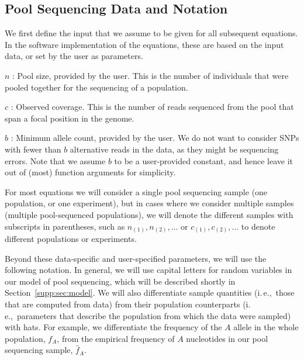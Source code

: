 \documentclass[a4paper,fontsize=9pt,DIV=14]{scrartcl}
\newcounter{todo}
\newcommand\todo[1]{}
\newcommand\secref[1]{Section~\ref{#1}}
\newcommand{\samplesize}{n}
\newcommand{\coverage}{c}
\newcommand{\empfreq}{\widehat{f}}
\newcommand{\ie}{i.\,e.,~}
\begin{document}
\subsection{Pool Sequencing Data and Notation}
\label{supp:sec:Definitions:sub:PoolSequencing}

We first define the input that we assume to be given for all subsequent equations.
In the software implementation of the equations, these are based on the input data, or set by the user as parameters.

$\samplesize$ :
Pool size, provided by the user. This is the number of individuals that were pooled together for the sequencing of a population.

$\coverage$ :
Observed coverage. This is the number of reads sequenced from the pool that span a focal position in the genome. 

$b$ :
Minimum allele count, provided by the user.
We do not want to consider SNPs with fewer than $b$ alternative reads in the data, as they might be sequencing errors.
Note that we assume $b$ to be a user-provided constant,
and hence leave it out of (most) function arguments for simplicity.

For most equations we will consider a single pool sequencing sample (one population, or one experiment), but in cases where we consider multiple samples (multiple pool-sequenced populations), we will denote the different samples with subscripts in parentheses, such as $\samplesize_{(1)}, \samplesize_{(2)},\ldots$ or $\coverage_{(1)}, \coverage_{(2)}, \ldots$ to denote different populations or experiments.

Beyond these data-specific and user-specified parameters, we will use the following notation.  In general, we will use capital letters for random variables in our model of pool sequencing, which will be described shortly in \secref{supp:sec:model}.  We will also differentiate sample quantities (\ie those that are computed from data) from their population counterparts (\ie parameters that describe the population from which the data were sampled) with hats.  For example, we differentiate the frequency of the $A$ allele in the whole population, $f_A$, from the empirical frequency of $A$ nucleotides in our pool sequencing sample, $\empfreq_A$.
\end{document}
